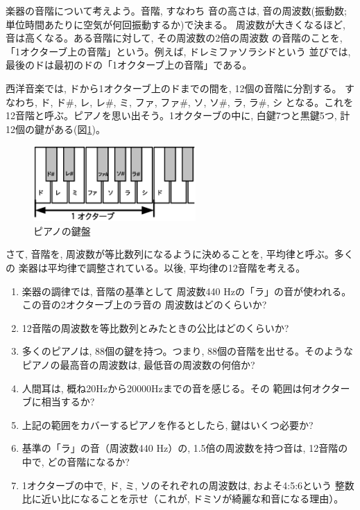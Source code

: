 \begin{exq}\label{q:heikinritsu} 楽器の音階について考えよう。音階, すなわち
音の高さは, 音の周波数(振動数; 単位時間あたりに空気が何回振動するか)で決まる。
周波数が大きくなるほど, 音は高くなる。ある音階に対して, その周波数の2倍の周波数
の音階のことを, 「1オクターブ上の音階」という。例えば, ドレミファソラシドという
並びでは, 最後のドは最初のドの「1オクターブ上の音階」である。

西洋音楽では, ドから1オクターブ上のドまでの間を, 12個の音階に分割する。
すなわち, ド, ド\#, レ, レ\#, ミ, ファ, ファ\#, ソ, ソ\#, ラ, ラ\#, シ
となる。これを12音階と呼ぶ。ピアノを思い出そう。1オクターブの中に, 
白鍵7つと黒鍵5つ, 計12個の鍵がある(図\ref{fig:octave})。
\begin{figure}[h]
    \centering
    \includegraphics[width=6.2cm]{octave.eps}
    \caption{ピアノの鍵盤}\label{fig:octave}
\end{figure}

さて, 音階を, 周波数が等比数列になるように決めることを, 平均律と呼ぶ。多くの
楽器は平均律で調整されている。以後, 平均律の12音階を考える。
\begin{enumerate}
\item 楽器の調律では, 音階の基準として
周波数440 Hzの「ラ」の音が使われる。この音の2オクターブ上のラ音の
周波数はどのくらいか?
\item 12音階の周波数を等比数列とみたときの公比はどのくらいか?
\item 多くのピアノは, 88個の鍵を持つ。つまり, 88個の音階を出せる。そのような
ピアノの最高音の周波数は, 最低音の周波数の何倍か?
\item 人間耳は, 概ね20Hzから20000Hzまでの音を感じる。その
範囲は何オクターブに相当するか?
\item 上記の範囲をカバーするピアノを作るとしたら, 鍵はいくつ必要か?
\item 基準の「ラ」の音（周波数440 Hz）の, 1.5倍の周波数を持つ音は, 12音階の
中で, どの音階になるか?
\item 1オクターブの中で, ド, ミ, ソのそれぞれの周波数は, およそ4:5:6という
整数比に近い比になることを示せ（これが, ドミソが綺麗な和音になる理由）。
\end{enumerate}
\end{exq}

